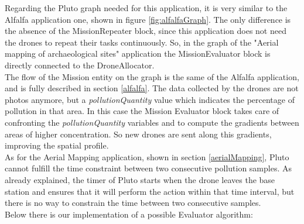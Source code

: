 Regarding the Pluto graph needed for this application, it is very similar to the Alfalfa\cite{alfalfa} application one, shown in figure \ref{fig:alfalfaGraph}.
The only difference is the absence of the MissionRepeater block, since this application does not need the drones to repeat their tasks continuously.
So, in the graph of the "Aerial mapping of archaeological sites" application the MissionEvaluator block is directly connected to the DroneAllocator.
\\

The flow of the Mission entity on the graph is the same of the Alfalfa\cite{alfalfa} application, and is fully described in section \ref{alfalfa}.
The data collected by the drones are not photos anymore, but a \textit{pollutionQuantity} value which indicates the percentage of pollution in that area.
In this case the Mission Evaluator block takes care of confronting the \textit{pollutionQuantity} variables and to compute the gradients between areas of higher concentration.
So new drones are sent along this gradients, improving the spatial profile.
\\


As for the Aerial Mapping application, shown in section \ref{aerialMapping}, Pluto cannot fulfill the time constraint between two consecutive pollution samples.
As already explained, the timer of Pluto starts when the drone leaves the base station and ensures that it will perform the action within that time interval, but there is no way to constrain the time between two consecutive samples.
\\


Below there is our implementation of a possible Evaluator algorithm:
\\

